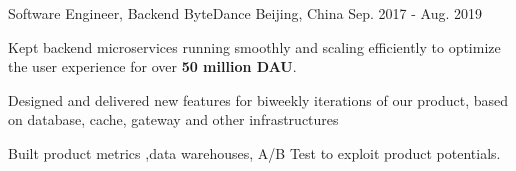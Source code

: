 
\begin{cventries}

  \cventry
    {Software Engineer, Backend} %
    {ByteDance} %
    {Beijing, China} %
    {Sep. 2017 - Aug. 2019} %
    {
      \begin{cvitems} 
        \item{Kept backend microservices running smoothly and scaling efficiently to optimize the user experience for over \textbf{50 million DAU}.}
        \item {Designed and delivered new features for biweekly iterations of our product, based on database, cache, gateway and other infrastructures}  
        \item {Built product metrics ,data warehouses, A/B Test to exploit product potentials.}
      \end{cvitems}
    }


\end{cventries}
